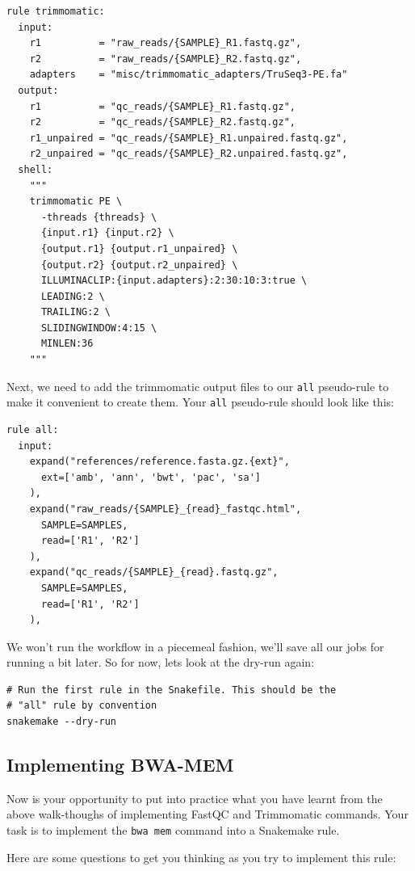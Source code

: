 \begin{lstlisting}
rule trimmomatic:
  input:
    r1          = "raw_reads/{SAMPLE}_R1.fastq.gz",
    r2          = "raw_reads/{SAMPLE}_R2.fastq.gz",
    adapters    = "misc/trimmomatic_adapters/TruSeq3-PE.fa"
  output:
    r1          = "qc_reads/{SAMPLE}_R1.fastq.gz",
    r2          = "qc_reads/{SAMPLE}_R2.fastq.gz",
    r1_unpaired = "qc_reads/{SAMPLE}_R1.unpaired.fastq.gz",
    r2_unpaired = "qc_reads/{SAMPLE}_R2.unpaired.fastq.gz",
  shell:
    """
    trimmomatic PE \
      -threads {threads} \
      {input.r1} {input.r2} \
      {output.r1} {output.r1_unpaired} \
      {output.r2} {output.r2_unpaired} \
      ILLUMINACLIP:{input.adapters}:2:30:10:3:true \
      LEADING:2 \
      TRAILING:2 \
      SLIDINGWINDOW:4:15 \
      MINLEN:36
    """
\end{lstlisting}

Next, we need to add the trimmomatic output files to our \texttt{all} pseudo-rule to make it convenient to create them.
Your \texttt{all} pseudo-rule should look like this:

\begin{lstlisting}
rule all:
  input:
    expand("references/reference.fasta.gz.{ext}",
      ext=['amb', 'ann', 'bwt', 'pac', 'sa']
    ),
    expand("raw_reads/{SAMPLE}_{read}_fastqc.html",
      SAMPLE=SAMPLES,
      read=['R1', 'R2']
    ),
    expand("qc_reads/{SAMPLE}_{read}.fastq.gz",
      SAMPLE=SAMPLES,
      read=['R1', 'R2']
    ),
\end{lstlisting}

We won't run the workflow in a piecemeal fashion, we'll save all our jobs for running a bit later.
So for now, lets look at the dry-run again:

\begin{lstlisting}
# Run the first rule in the Snakefile. This should be the
# "all" rule by convention
snakemake --dry-run
\end{lstlisting}

\subsection{Implementing BWA-MEM}

Now is your opportunity to put into practice what you have learnt from the above walk-thoughs of implementing FastQC and Trimmomatic commands.
Your task is to implement the \texttt{bwa mem} command into a Snakemake rule.

Here are some questions to get you thinking as you try to implement this rule:

